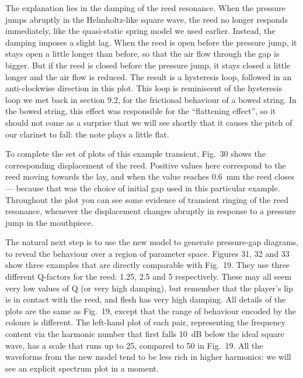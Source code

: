   The explanation lies in the damping of the reed resonance. When the pressure 
  jumps abruptly in the Helmholtz-like square wave, the reed no longer responds 
  immediately, like the quasi-static spring model we used earlier. Instead, the 
  damping imposes a slight lag. When the reed is open before the pressure jump, 
  it stays open a little longer than before, so that the air flow through the 
  gap is bigger. But if the reed is closed before the pressure jump, it stays 
  closed a little longer and the air flow is reduced. The result is a 
  hysteresis loop, followed in an anti-clockwise direction in this plot. This 
  loop is reminiscent of the hysteresis loop we met back in section 9.2, for 
  the frictional behaviour of a bowed string. In the bowed string, this effect 
  was responsible for the ``flattening effect'', so it should not come as a 
  surprise that we will see shortly that it causes the pitch of our clarinet to 
  fall: the note plays a little flat. 

  To complete the set of plots of this example transient, Fig.\ 30 shows the 
  corresponding displacement of the reed. Positive values here correspond to 
  the reed moving towards the lay, and when the value reaches 0.6~mm the reed 
  closes — because that was the choice of initial gap used in this particular 
  example. Throughout the plot you can see some evidence of transient ringing 
  of the reed resonance, whenever the displacement changes abruptly in response 
  to a pressure jump in the mouthpiece. 


  The natural next step is to use the new model to generate pressure-gap 
  diagrams, to reveal the behaviour over a region of parameter space. Figures 
  31, 32 and 33 show three examples that are directly comparable with Fig.\ 19. 
  They use three different Q-factors for the reed: 1.25, 2.5 and 5 
  respectively. These may all seem very low values of Q (or very high damping), 
  but remember that the player's lip is in contact with the reed, and flesh has 
  very high damping. All details of the plots are the same as Fig.\ 19, except 
  that the range of behaviour encoded by the colours is different. The 
  left-hand plot of each pair, representing the frequency content via the 
  harmonic number that first falls 10~dB below the ideal square wave, has a 
  scale that runs up to 25, compared to 50 in Fig.\ 19. All the waveforms from 
  the new model tend to be less rich in higher harmonics: we will see an 
  explicit spectrum plot in a moment. 

